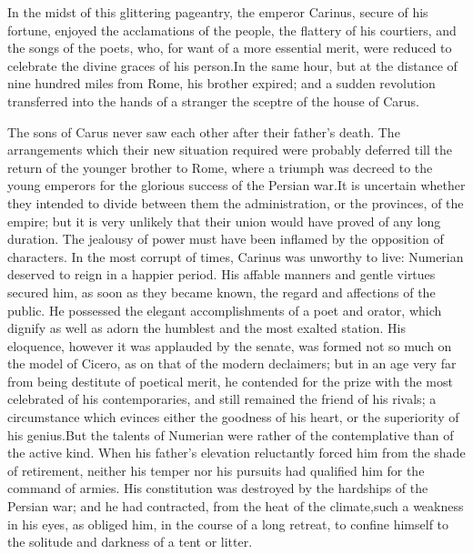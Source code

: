 

In the midst of this glittering pageantry, the emperor Carinus,
secure of his fortune, enjoyed the acclamations of the people,
the flattery of his courtiers, and the songs of the poets, who,
for want of a more essential merit, were reduced to celebrate the
divine graces of his person.\footnotemark[98] In the same hour, but at the
distance of nine hundred miles from Rome, his brother expired;
and a sudden revolution transferred into the hands of a stranger
the sceptre of the house of Carus.\footnotemark[99]



The sons of Carus never saw each other after their father’s
death. The arrangements which their new situation required were
probably deferred till the return of the younger brother to Rome,
where a triumph was decreed to the young emperors for the
glorious success of the Persian war.\footnotemark[100] It is uncertain whether
they intended to divide between them the administration, or the
provinces, of the empire; but it is very unlikely that their
union would have proved of any long duration. The jealousy of
power must have been inflamed by the opposition of characters. In
the most corrupt of times, Carinus was unworthy to live: Numerian
deserved to reign in a happier period. His affable manners and
gentle virtues secured him, as soon as they became known, the
regard and affections of the public. He possessed the elegant
accomplishments of a poet and orator, which dignify as well as
adorn the humblest and the most exalted station. His eloquence,
however it was applauded by the senate, was formed not so much on
the model of Cicero, as on that of the modern declaimers; but in
an age very far from being destitute of poetical merit, he
contended for the prize with the most celebrated of his
contemporaries, and still remained the friend of his rivals; a
circumstance which evinces either the goodness of his heart, or
the superiority of his genius.\footnotemark[101] But the talents of Numerian
were rather of the contemplative than of the active kind. When
his father’s elevation reluctantly forced him from the shade of
retirement, neither his temper nor his pursuits had qualified him
for the command of armies. His constitution was destroyed by the
hardships of the Persian war; and he had contracted, from the
heat of the climate,\footnotemark[102] such a weakness in his eyes, as obliged
him, in the course of a long retreat, to confine himself to the
solitude and darkness of a tent or litter.

